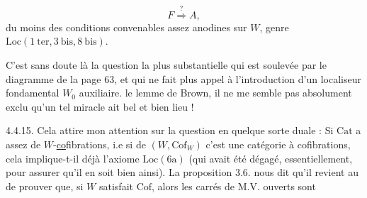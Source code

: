 
\[
 F\overset{?}{\Longrightarrow} A,
\]
du moins  des conditions convenables assez anodines sur $W$, genre $\mathrm{Loc}(1\ \mathrm{ter},3\ \mathrm{bis},8\ \mathrm{bis})$.

C'est sans doute là la question la plus substantielle  qui est soulevée par le diagramme de la page 63, et qui ne fait plus appel à l'introduction d'un localiseur fondamental $W_0$ auxiliaire.  le lemme de Brown, il ne me semble pas absolument exclu qu'un tel miracle ait bel et bien lieu !

4.4.15.  Cela attire mon attention sur la question en quelque sorte duale : Si $\mathrm{Cat}$ a assez de $W$-\uline{co}fibrations, i.e si  de $(W,\mathrm{Cof}_W)$ c'est une catégorie à cofibrations, cela implique-t-il déjà l'axiome $\mathrm{Loc}(6\mathrm a)$ (qui avait été dégagé, essentiellement, pour assurer qu'il en soit bien ainsi). La proposition 3.6.  nous dit qu'il revient au  de prouver que, si $W$ satisfait $\mathrm{Cof}$, alors les carrés de M.V. ouverts sont
